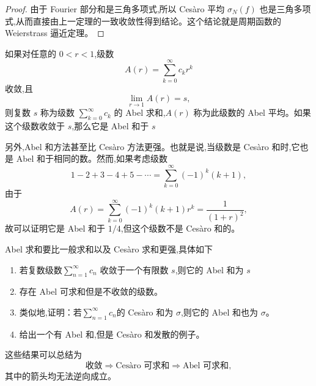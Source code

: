 \begin{proof}
	由于 Fourier 部分和是三角多项式,所以 Ces\`aro 平均 $\sigma_N(f)$ 也是三角多项式,从而直接由上一定理的一致收敛性得到结论。这个结论就是周期函数的 Weierstrass 逼近定理。
\end{proof}

\begin{definition}
	如果对任意的 $0<r<1$,级数
\[
A(r)=\sum_{k=0}^{\infty}c_k r^k
\]
收敛,且
\[
\lim_{r\to1}A(r)=s,
\]
则复数 $s$ 称为级数 $\sum\limits_{k=0}^{\infty}c_k$ 的 Abel 求和,$A(r)$ 称为此级数的 Abel 平均。如果这个级数收敛于 $s$,那么它是 Abel 和于 $s$
\end{definition}
 另外,Abel 和方法甚至比 Ces\`aro 方法更强。也就是说,当级数是 Ces\`aro 和时,它也是 Abel 和于相同的数。然而,如果考虑级数
\[
1-2+3-4+5-\cdots=\sum_{k=0}^{\infty}(-1)^k(k+1),
\]
由于
\[
A(r)=\sum_{k=0}^{\infty}(-1)^k(k+1)r^k=\frac1{(1+r)^2},
\]
故可以证明它是 Abel 和于 $1/4$,但这个级数不是 Ces\`aro 和的。
\begin{proposition}
	Abel 求和要比一般求和以及 Ces\`aro 求和更强,具体如下
	
	\begin{enumerate}
		\item[(a)] 若复数级数$\sum\limits_{n=1}^{\infty}c_n$
		收敛于一个有限数 $s$,则它的 Abel 和为 $s$
		\item[(b)] 存在 Abel 可求和但是不收敛的级数。
		\item[(c)] 类似地,证明：若$\sum\limits_{n=1}^{\infty}c_n$的 Ces\`aro 和为 $\sigma$,则它的 Abel 和也为 $\sigma$。
		\item[(d)] 给出一个有 Abel 和,但是 Ces\`aro 和发散的例子。
	\end{enumerate}
	这些结果可以总结为
	\[
	\text{收敛}
	\Longrightarrow
	\text{Ces\`aro 可求和}
	\Longrightarrow
	\text{Abel 可求和},
	\]
	其中的箭头均无法逆向成立。
\end{proposition}

